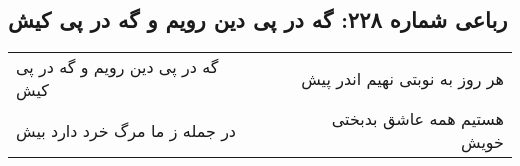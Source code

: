 \begin{center}
\section*{رباعی شماره ۲۲۸: گه در پی دین رویم و گه در پی کیش}
\label{sec:sh228}
\begin{longtable}{l p{0.5cm} r}
گه در پی دین رویم و گه در پی کیش
&&
هر روز به نوبتی نهیم اندر پیش
\\
در جمله ز ما مرگ خرد دارد بیش
&&
هستیم همه عاشق بدبختی خویش
\\
\end{longtable}
\end{center}
